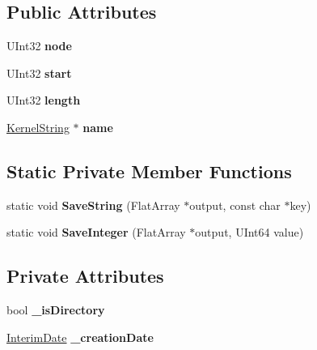 \subsection*{Public Attributes}
\begin{DoxyCompactItemize}
\item 
\mbox{\label{class_i_s_o9660_driver_1_1_generic_entry_a3e4b5da3520ee802a7aec03d8c7589eb}} 
U\+Int32 {\bfseries node}
\item 
\mbox{\label{class_i_s_o9660_driver_1_1_generic_entry_a281aeac84ff6fed9afba7fa99ab076ca}} 
U\+Int32 {\bfseries start}
\item 
\mbox{\label{class_i_s_o9660_driver_1_1_generic_entry_ad5af615529f2823846f1205b9a3fea8f}} 
U\+Int32 {\bfseries length}
\item 
\mbox{\label{class_i_s_o9660_driver_1_1_generic_entry_a8e4ca44b4109033c6b526b01daffc87c}} 
\hyperlink{class_kernel_string}{Kernel\+String} $\ast$ {\bfseries name}
\end{DoxyCompactItemize}
\subsection*{Static Private Member Functions}
\begin{DoxyCompactItemize}
\item 
\mbox{\label{class_i_s_o9660_driver_1_1_generic_entry_a60d478f922eed16f71ee2bd8b736438f}} 
static void {\bfseries Save\+String} (Flat\+Array $\ast$output, const char $\ast$key)
\item 
\mbox{\label{class_i_s_o9660_driver_1_1_generic_entry_a4f6823d68ad344923d24a35e781fbd29}} 
static void {\bfseries Save\+Integer} (Flat\+Array $\ast$output, U\+Int64 value)
\end{DoxyCompactItemize}
\subsection*{Private Attributes}
\begin{DoxyCompactItemize}
\item 
\mbox{\label{class_i_s_o9660_driver_1_1_generic_entry_a3be07e0ee32ce5577cbb44b5bd7d9cc6}} 
bool {\bfseries \+\_\+is\+Directory}
\item 
\mbox{\label{class_i_s_o9660_driver_1_1_generic_entry_a8e5b26bece08a4775b6d329c0458b4ed}} 
\hyperlink{class_i_s_o9660_driver_1_1_generic_entry_1_1_interim_date}{Interim\+Date} {\bfseries \+\_\+creation\+Date}
\end{DoxyCompactItemize}
